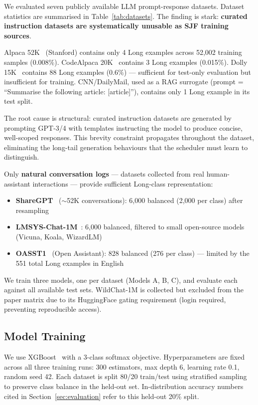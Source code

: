\documentclass[10pt,letterpaper]{article}
\begin{document}
We evaluated seven publicly available LLM prompt-response datasets. Dataset statistics are summarised in Table~\ref{tab:datasets}. The finding is stark: \textbf{curated instruction datasets are systematically unusable as SJF training sources}.

Alpaca 52K~\cite{taori2023alpaca} (Stanford) contains only 4 Long examples across 52,002 training samples (0.008\%). CodeAlpaca 20K~\cite{chaudhary2023codealpaca} contains 3 Long examples (0.015\%). Dolly 15K~\cite{conover2023dolly} contains 88 Long examples (0.6\%) --- sufficient for test-only evaluation but insufficient for training. CNN/DailyMail, used as a RAG surrogate (prompt = ``Summarise the following article: [article]''), contains only 1 Long example in its test split.

The root cause is structural: curated instruction datasets are generated by prompting GPT-3/4 with templates instructing the model to produce concise, well-scoped responses. This brevity constraint propagates throughout the dataset, eliminating the long-tail generation behaviours that the scheduler must learn to distinguish.

Only \textbf{natural conversation logs} --- datasets collected from real human-assistant interactions --- provide sufficient Long-class representation:
\begin{itemize}
  \item \textbf{ShareGPT}~\cite{chiang2023vicuna} (${\sim}$52K conversations): 6,000 balanced (2,000 per class) after resampling
  \item \textbf{LMSYS-Chat-1M}~\cite{zheng2023lmsys}: 6,000 balanced, filtered to small open-source models (Vicuna, Koala, WizardLM)
  \item \textbf{OASST1}~\cite{kopf2023oasst} (Open Assistant): 828 balanced (276 per class) --- limited by the 551 total Long examples in English
\end{itemize}

We train three models, one per dataset (Models A, B, C), and evaluate each against all available test sets. WildChat-1M is collected but excluded from the paper matrix due to its HuggingFace gating requirement (login required, preventing reproducible access).

\subsection{Model Training}

We use XGBoost~\cite{chen2016xgboost} with a 3-class softmax objective. Hyperparameters are fixed across all three training runs: 300 estimators, max depth 6, learning rate 0.1, random seed 42. Each dataset is split 80/20 train/test using stratified sampling to preserve class balance in the held-out set. In-distribution accuracy numbers cited in Section~\ref{sec:evaluation} refer to this held-out 20\% split.
\end{document}

